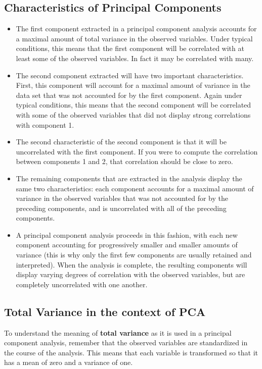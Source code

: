 \documentclass[a4paper,12pt]{article}
\begin{document}
\subsection{Characteristics of Principal Components}
\begin{itemize}
	\item The first component extracted in a principal component analysis accounts for a maximal amount of total variance in the observed variables. Under typical conditions, this means that the first component will be correlated with at least
	some of the observed variables.  In fact it may be correlated with many.
	
\item The second component extracted will have two important characteristics.  First,  this component
	will account for a maximal amount of variance in the data set that was not accounted for by the
	first component.  Again under typical conditions, this means that the second component will be
	correlated with some of the observed variables that did not display strong correlations with
	component 1.
\item The second characteristic of the second component is that it will be uncorrelated with the first
	component. If you were to compute the correlation between components 1 and 2, that
	correlation should be close to zero.
	
\item The remaining components that are extracted in the analysis display the same two characteristics:
	each component accounts for a maximal amount of variance in the observed variables that was
	not accounted for by the preceding components, and is uncorrelated with all of the preceding
	components.  
	\item A principal component analysis proceeds in this fashion, with each new component
	accounting for progressively smaller and smaller amounts of variance (this is why only the first
	few components are usually retained and interpreted).  When the analysis is complete, the
	resulting components will display varying degrees of correlation with the observed variables, but
	are completely uncorrelated with one another.
\end{itemize}


\subsection{Total Variance in the context of PCA}
To understand the meaning of \textbf{total
	variance} as it is used in a principal component analysis, remember that the observed
variables are standardized in the course of the analysis.  This means that each variable is
transformed so that it has a mean of zero and a variance of one.
\end{document}
